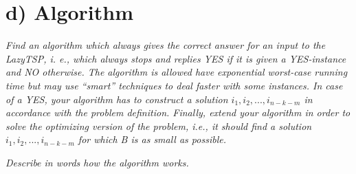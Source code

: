 
\section{d) Algorithm}

\textit{Find an algorithm which always gives the correct answer for an input to the
LazyTSP, i. e., which always stops and replies YES if it is given a YES-instance
and NO otherwise. The algorithm is allowed have exponential worst-case running
time but may use “smart” techniques to deal faster with some instances. In case of
a YES, your algorithm has to construct a solution \(i_1, i_2, ..., i_{n-k-m}\) in accordance
with the problem definition. Finally, extend your algorithm in order to solve the
optimizing version of the problem, i.e., it should find a solution \(i_1, i_2, ..., i_{n-k-m}\)
for which B is as small as possible.}

\textit{Describe in words how the algorithm works.}


